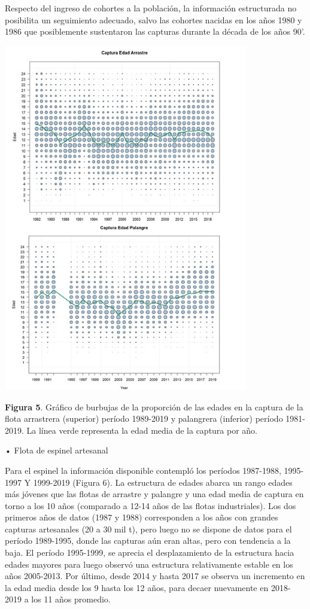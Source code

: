 \documentclass[
  spanish,
]{article}
\begin{document}
Respecto del ingreso de cohortes a la población, la información
estructurada no posibilita un seguimiento adecuado, salvo las cohortes
nacidas en los años 1980 y 1986 que posiblemente sustentaron las
capturas durante la década de los años 90'.

\begin{center}
\includegraphics[width=0.8\textwidth]{Figuras/Figura_5.png}
\end{center}

\small \textbf{Figura 5}. Gráfico de burbujas de la proporción de las
edades en la captura de la flota arrastrera (superior) período 1989-2019
y palangrera (inferior) período 1981-2019. La línea verde representa la
edad media de la captura por año. \vspace{0.5cm} \normalsize

• Flota de espinel artesanal

Para el espinel la información disponible contempló los períodos
1987-1988, 1995-1997 Y 1999-2019 (Figura 6). La estructura de edades
abarca un rango edades más jóvenes que las flotas de arrastre y palangre
y una edad media de captura en torno a los 10 años (comparado a 12-14
años de las flotas industriales). Los dos primeros años de datos (1987 y
1988) corresponden a los años con grandes capturas artesanales (20 a 30
mil t), pero luego no se dispone de datos para el período 1989-1995,
donde las capturas aún eran altas, pero con tendencia a la baja. El
período 1995-1999, se aprecia el desplazamiento de la estructura hacia
edades mayores para luego observó una estructura relativamente estable
en los años 2005-2013. Por último, desde 2014 y hasta 2017 se observa un
incremento en la edad media desde los 9 hasta los 12 años, para decaer
nuevamente en 2018-2019 a los 11 años promedio.
\end{document}
